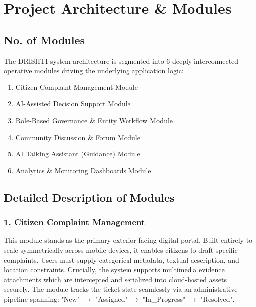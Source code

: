 \documentclass[12pt,a4paper]{report}
\begin{document}
\chapter{Project Architecture \& Modules}

\section{No. of Modules}
The DRISHTI system architecture is segmented into 6 deeply interconnected operative modules driving the underlying application logic:
\begin{enumerate}
    \item Citizen Complaint Management Module
    \item AI-Assisted Decision Support Module
    \item Role-Based Governance \& Entity Workflow Module
    \item Community Discussion \& Forum Module
    \item AI Talking Assistant (Guidance) Module
    \item Analytics \& Monitoring Dashboards Module
\end{enumerate}

\section{Detailed Description of Modules}

\subsection{1. Citizen Complaint Management}
This module stands as the primary exterior-facing digital portal. Built entirely to scale symmetrically across mobile devices, it enables citizens to draft specific complaints. Users must supply categorical metadata, textual description, and location constraints. Crucially, the system supports multimedia evidence attachments which are intercepted and serialized into cloud-hosted assets securely. The module tracks the ticket state seamlessly via an administrative pipeline spanning: "New" $\rightarrow$ "Assigned" $\rightarrow$ "In\_Progress" $\rightarrow$ "Resolved". 
\end{document}

